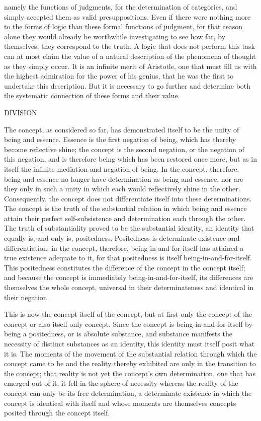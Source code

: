 namely the functions of judgments,
for the determination of categories,
and simply accepted them as valid presuppositions.
Even if there were nothing more to the forms of logic
than these formal functions of judgment,
for that reason alone they would already be
worthwhile investigating to see how far,
by themselves, they correspond to the truth.
A logic that does not perform this task
can at most claim the value of
a natural description of the phenomena of thought
as they simply occur.
It is an infinite merit of Aristotle,
one that must fill us with the highest admiration
for the power of his genius,
that he was the first to undertake this description.
But it is necessary to go further
and determine both the systematic connection
of these forms and their value.

DIVISION

The concept, as considered so far,
has demonstrated itself to be
the unity of being and essence.
Essence is the first negation of being,
which has thereby become reflective shine;
the concept is the second negation,
or the negation of this negation,
and is therefore being
which has been restored once more,
but as in itself the infinite mediation
and negation of being.
In the concept, therefore,
being and essence no longer have
determination as being and essence,
nor are they only in such a unity
in which each would reflectively shine in the other.
Consequently, the concept does not differentiate
itself into these determinations.
The concept is the truth of the substantial relation
in which being and essence attain their perfect
self-subsistence and determination each through the other.
The truth of substantiality proved
to be the substantial identity,
an identity that equally is,
and only is, positedness.
Positedness is determinate existence and differentiation;
in the concept, therefore, being-in-and-for-itself
has attained a true existence adequate to it,
for that positedness is itself being-in-and-for-itself.
This positedness constitutes the difference
of the concept in the concept itself;
and because the concept is
immediately being-in-and-for-itself,
its differences are themselves the whole concept,
universal in their determinateness
and identical in their negation.

This is now the concept itself of the concept,
but at first only the concept of the concept
or also itself only concept.
Since the concept is being-in-and-for-itself
by being a positedness, or is absolute substance,
and substance manifests the necessity of
distinct substances as an identity,
this identity must itself posit what it is.
The moments of the movement of the substantial relation
through which the concept came to be
and the reality thereby exhibited are
only in the transition to the concept;
that reality is not yet the
concept's own determination,
one that has emerged out of it;
it fell in the sphere of necessity
whereas the reality of the concept
can only be its free determination,
a determinate existence in which
the concept is identical with itself
and whose moments are themselves concepts
posited through the concept itself.

